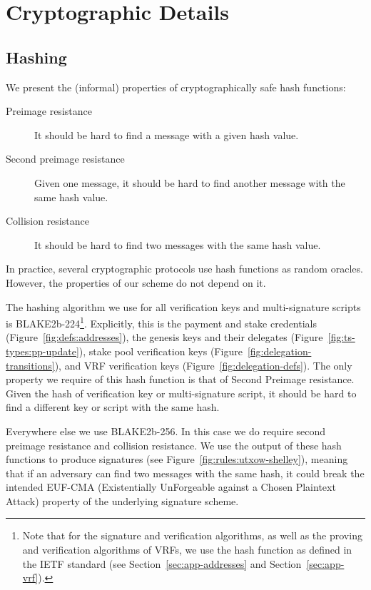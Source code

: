 \section{Cryptographic Details}
\label{sec:crypto-details}

\subsection{Hashing}
We present the (informal) properties of cryptographically safe hash functions:
\begin{description}
\item[Preimage resistance] It should be hard to find a message with a given hash value.
\item[Second preimage resistance] Given one message, it should be hard to find another message with the same hash value.
\item[Collision resistance] It should be hard to find two messages with the same hash value. 
\end{description}

\noindent In practice, several cryptographic protocols use hash functions as random oracles. 
However, the properties of our scheme do not depend on it.  

The hashing algorithm we use for all verification keys and multi-signature scripts is BLAKE2b-224\footnote{Note that for the signature 
and verification algorithms, as well as the proving and verification algorithms of VRFs, we use the hash function as defined in the IETF standard (see Section~\ref{sec:app-addresses} and Section~\ref{sec:app-vrf}).}.
Explicitly, this is the payment and stake credentials (Figure~\ref{fig:defs:addresses}),
the genesis keys and their delegates (Figure~\ref{fig:ts-types:pp-update}),
stake pool verification keys (Figure~\ref{fig:delegation-transitions}),
and VRF verification keys (Figure~\ref{fig:delegation-defs}). 
The only property we require of this hash function is that of Second Preimage resistance. Given the hash of verification key or multi-signature script, it should be hard to find a different key or script with the same hash. 

Everywhere else we use BLAKE2b-256. In this case we do require second preimage resistance and collision resistance. We use the output of these hash functions to produce signatures (see Figure~\ref{fig:rules:utxow-shelley}), meaning that if an adversary can find two messages with the same hash, it could break the intended EUF-CMA (Existentially UnForgeable against a Chosen Plaintext Attack) property of the underlying signature scheme. 
 
